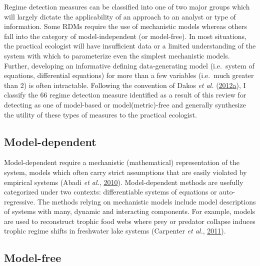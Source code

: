 \documentclass[print]{nuthesis}
\begin{document}
Regime detection measures can be classified into one of two major groups which will largely dictate the applicability of an approach to an analyst or type of information. Some RDMs require the use of mechanistic models whereas others fall into the category of model-independent (or model-free). In most situations, the practical ecologist will have insufficient data or a limited understanding of the system with which to parameterize even the simplest mechanistic models. Further, developing an informative defining data-generating model (i.e.~system of equations, differential equations) for more than a few variables (i.e.~much greater than 2) is often intractable. Following the convention of Dakos \emph{et al.} (\protect\hyperlink{ref-dakos2012methods}{2012}\protect\hyperlink{ref-dakos2012methods}{a}), I classify the 66 regime detection measure identified as a result of this review for detecting as one of model-based or model(metric)-free and generally synthesize the utility of these types of measures to the practical ecologist.

\hypertarget{model-dependent}{%
\subsection{Model-dependent}\label{model-dependent}}

Model-dependent require a mechanistic (mathematical) representation of the system, models which often carry strict assumptions that are easily violated by empirical systems (Abadi \emph{et al.}, \protect\hyperlink{ref-abadi2010assessment}{2010}). Model-dependent methods are usefully categorized under two contexts: differentiable systems of equations or auto-regressive. The methods relying on mechanistic models include model descriptions of systems with many, dynamic and interacting components. For example, models are used to reconstruct trophic food webs where prey or predator collapse induces trophic regime shifts in freshwater lake systems (Carpenter \emph{et al.}, \protect\hyperlink{ref-carpenter2011early}{2011}).

\hypertarget{model-free}{%
\subsection{Model-free}\label{model-free}}
\end{document}

